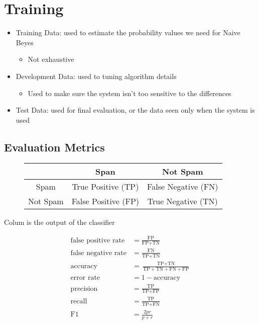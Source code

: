\section{Training}

  \begin{itemize}
    \item Training Data: used to estimate the probability values we
    need for Naive Beyes
    \begin{itemize}
      \item Not exhaustive
    \end{itemize}

    \item Development Data: used to tuning algorithm details
    \begin{itemize}
      \item Used to make sure the system isn't too sensitive to the differences
    \end{itemize}

    \item Test Data: used for final evaluation, or the data seen only when
    the system is used
  \end{itemize}

  \subsection{Evaluation Metrics}

    \begin{figure}[H]
      \centering
      \begin{tabular}{ | c | c | c |}
        \hline
        & Span & Not Spam \\ \hline
        Spam & True Positive (TP) & False Negative (FN) \\ \hline
        Not Spam & False Positive (FP) & True Negative (TN) \\ \hline
      \end{tabular}
    \end{figure}

    Colum is the output of the classifier

    \begin{align}
      \text{false positive rate} &= \frac{\text{FP}}{\text{FP} + \text{TN}} \\
      \text{false negative rate} &= \frac{\text{FN}}{\text{TP} + \text{TN}} \\
      \text{accuracy} &= \frac{\text{TP} + \text{TN}}{\text{TP} + \text{TN} + \text{FN} + \text{FP}} \\
      \text{error rate} &= 1 - \text{accuracy} \\
      \text{precision} &= \frac{\text{TP}}{\text{TP} + \text{FP}} \\
      \text{recall} &= \frac{\text{TP}}{\text{TP} + \text{FN}} \\
      \text{F1} &= \frac{2 pr}{p + r}
    \end{align}

